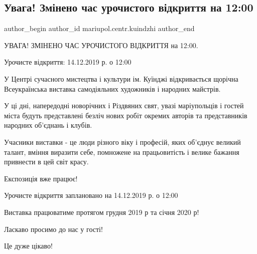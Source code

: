  
 
 
 
 

\subsection{Увага! Змінено час урочистого відкриття на 12:00}
\label{sec:12_12_2019.fb.mariupol.centr.kuindzhi.2.uvaga_zmineno_chas_urochystogo_vidkryttja_na_1200}

\ifcmt
 author_begin
   author_id mariupol.centr.kuindzhi
 author_end
\fi

УВАГА! ЗМІНЕНО ЧАС УРОЧИСТОГО ВІДКРИТТЯ на 12:00.

Урочисте відкриття: 14.12.2019 р. о 12:00

У Центрі сучасного мистецтва і культури ім. Куїнджі відкривається щорічна
Всеукраїнська виставка самодіяльних художників і народних майстрів.

У ці дні, напередодні новорічних і Різдвяних свят, увазі маріупольців і гостей
міста будуть представлені безліч нових робіт окремих авторів та представників
народних об'єднань і клубів.

Учасники виставки - це люди різного віку і професій, яких об'єднує великий
талант, вміння виразити себе, помножене на працьовитість і велике бажання
привнести в цей світ красу.

Експозиція вже працює!

Урочисте відкриття заплановано на 14.12.2019 р. о 12:00

Виставка працюватиме протягом грудня 2019 р та січня 2020 р!

Ласкаво просимо до нас у гості!

Це дуже цікаво!
